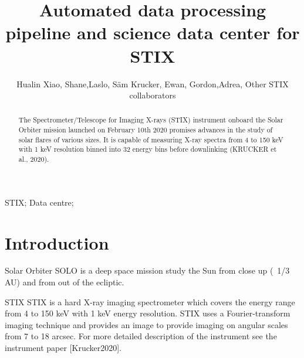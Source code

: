 \documentclass[preprint,11pt]{elsarticle}
\begin{document}
\begin{frontmatter}

\title{Automated data processing pipeline and science data center for STIX}
\author{Hualin Xiao, Shane,Laslo, S\"am Krucker,  Ewan,  Gordon,Adrea,  Other STIX collaborators}



\address[fhnw]{University of Applied Sciences and Arts Northwestern Switzerland (FHNW), 5200 Windisch, Switzerland}
\begin{abstract}
 The
Spectrometer/Telescope for Imaging X-rays (STIX) instrument onboard the Solar Orbiter mission launched
on February 10th 2020 promises advances in the study of solar flares of various sizes. It is capable of measuring
X-ray spectra from 4 to 150 keV with 1 keV resolution binned into 32 energy bins before downlinking
(KRUCKER et al., 2020).

\end{abstract}

 

\begin{keyword}
STIX; Data centre;
\end{keyword}
\end{frontmatter}

\section{Introduction}
Solar Orbiter
SOLO is a deep space mission study the Sun from close up (~1/3 AU) and from out of the ecliptic.

STIX
STIX is a hard X-ray imaging spectrometer which covers the energy range from 4 to 150 keV with 1 keV energy resolution. STIX uses a Fourier-transform imaging technique and provides an image to provide imaging on angular scales from 7 to 18 arcsec. For more detailed description of the instrument see the instrument paper [Krucker2020].
\end{document}
